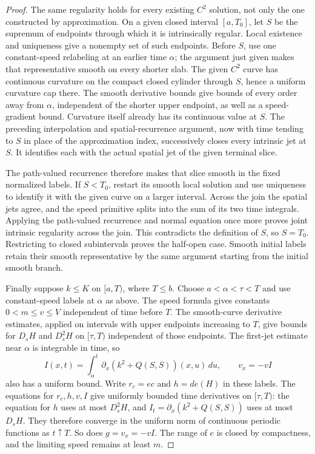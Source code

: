 \begin{proof}
The same regularity holds for every existing $C^2$ solution,
not only the one constructed by approximation.  On a given closed
interval $[a,T_0]$, let $S$ be the supremum of endpoints through
which it is intrinsically regular.  Local existence and uniqueness
give a nonempty set of such endpoints.  Before $S$, use one
constant-speed relabeling at an earlier time $\alpha$; the argument
just given makes that representative smooth on every shorter slab.
The given $C^2$ curve has continuous curvature on the compact
closed cylinder through $S$, hence a uniform curvature cap there.
The smooth derivative bounds give bounds of every order away
from $\alpha$, independent of the shorter upper endpoint, as
well as a speed-gradient bound.  Curvature itself already has
its continuous value at $S$.  The preceding interpolation and
spatial-recurrence argument, now with time tending to $S$ in
place of the approximation index, successively closes every
intrinsic jet at $S$.  It identifies each with the actual spatial
jet of the given terminal slice.

The path-valued recurrence therefore makes that slice smooth
in the fixed normalized labels.  If $S<T_0$, restart its smooth
local solution and use uniqueness to identify it with the given
curve on a larger interval.  Across the join the spatial jets
agree, and the speed primitive splits into the sum of its two
time integrals.  Applying the path-valued recurrence and normal
equation once more proves joint intrinsic regularity across the
join.  This contradicts the definition of $S$, so $S=T_0$.
Restricting to closed subintervals proves the half-open case.
Smooth initial labels retain their smooth representative by
the same argument starting from the initial smooth branch.

Finally suppose $k\leq K$ on $[a,T)$, where $T\leq b$.
Choose $a<\alpha<\tau<T$ and use constant-speed labels at
$\alpha$ as above.  The speed formula gives constants
$0<m\leq v\leq V$ independent of time before $T$.
The smooth-curve derivative estimates, applied on intervals with
upper endpoints increasing to $T$, give bounds for $D_sH$ and
$D_s^2H$ on $[\tau,T)$ independent of those endpoints.
The first-jet estimate near $\alpha$ is integrable in time, so
\[
 I(x,t)=\int_\alpha^t\partial_x(k^2+Q(S,S))(x,u)\,du,
 \qquad v_x=-vI
\]
also has a uniform bound.  Write $r_c=ec$ and $h=de(H)$ in
these labels.  The equations for $r_c,h,v,I$ give uniformly bounded
time derivatives on $[\tau,T)$: the equation for $h$ uses at
most $D_s^2H$, and $I_t=\partial_x(k^2+Q(S,S))$ uses at
most $D_sH$.  They therefore converge in the uniform norm of
continuous periodic functions as $t\uparrow T$.  So does
$g=v_x=-vI$.  The range of $e$ is closed by compactness, and
the limiting speed remains at least $m$.


\end{proof}
